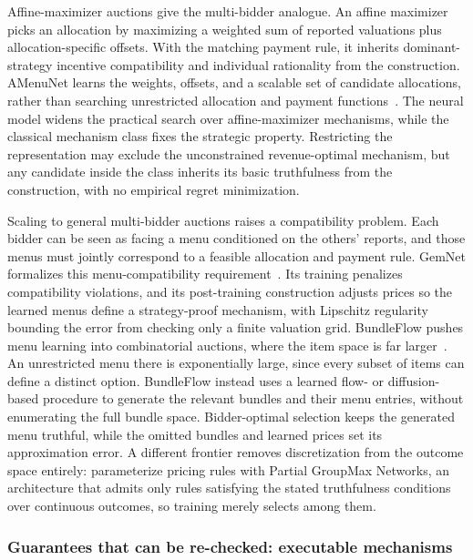  Affine-maximizer auctions give the
multi-bidder analogue. An affine maximizer picks an allocation by maximizing a
weighted sum of reported valuations plus allocation-specific offsets. With the
matching payment rule, it inherits dominant-strategy incentive compatibility and
individual rationality from the construction. AMenuNet learns the weights, offsets,
and a scalable set of candidate allocations, rather than searching unrestricted
allocation and payment functions~\citep{Duan2023}. The neural model widens the
practical search over affine-maximizer mechanisms, while the classical mechanism
class fixes the strategic property. Restricting the representation may exclude the
unconstrained revenue-optimal mechanism, but any candidate inside the class inherits
its basic truthfulness from the construction, with no empirical regret minimization.

 Scaling to general multi-bidder auctions raises a
compatibility problem. Each bidder can be seen as facing a menu conditioned on the
others' reports, and those menus must jointly correspond to a feasible allocation
and payment rule. GemNet formalizes this menu-compatibility
requirement~\citep{Duetting2024}. Its training penalizes compatibility violations,
and its post-training construction adjusts prices so the learned menus define a
strategy-proof mechanism, with Lipschitz regularity bounding the error from checking
only a finite valuation grid. BundleFlow pushes menu learning into combinatorial
auctions, where the item space is far larger~\citep{WangBundleFlow2025}. An
unrestricted menu there is exponentially large, since every subset of items can
define a distinct option. BundleFlow instead uses a learned flow- or diffusion-based
procedure to generate the relevant bundles and their menu entries, without
enumerating the full bundle space. Bidder-optimal selection keeps the generated menu
truthful, while the omitted bundles and learned prices set its approximation error.
A different frontier removes discretization from the outcome space entirely:
\citet{TEDI2025} parameterize pricing rules with Partial GroupMax Networks, an
architecture that admits only rules satisfying the stated truthfulness conditions
over continuous outcomes, so training merely selects among them.

\subsubsection{Guarantees that can be re-checked: executable mechanisms}

